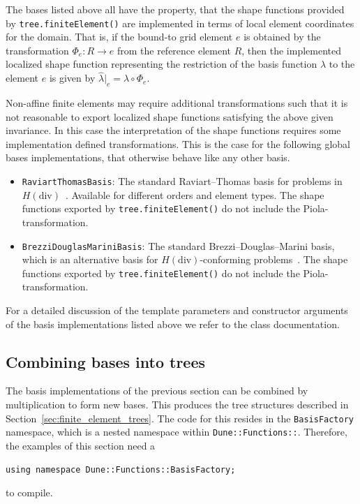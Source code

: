 \documentclass[a4paper,10pt,headings=normal,bibliography=totoc]{scrartcl}
\newcommand{\cpp}[1]{\lstinline[basicstyle=\ttfamily]!#1!}
\newcommand{\todograeser}[1]{\todo[inline,color=lightblue,author=CG]{#1}}
\begin{document}
The bases listed above all have the property, that the shape functions provided by
\cpp{tree.finiteElement()} are implemented in terms of local element coordinates
for the domain. That is, if the bound-to grid element $e$ is obtained by the transformation
$\Phi_e:R \to e$ from the reference element $R$, then the implemented localized shape function
representing the restriction of the basis function $\lambda$ to the
element $e$ is given by $\hat{\lambda}|_e = \lambda\circ\Phi_e$.

Non-affine finite elements may require additional transformations such that it is
not reasonable to export localized shape functions satisfying the above given
invariance. In this case the interpretation of the shape functions requires some
implementation defined transformations. This is the case for the following global
bases implementations, that otherwise behave like any other basis.

\begin{itemize}
 \item \cpp{RaviartThomasBasis}: The standard Raviart--Thomas basis for problems in
  $H(\text{div})$~\cite{boffi_brezzi_fortin:2013}.  Available for different orders and element types.
  The shape functions exported by \cpp{tree.finiteElement()} do not include the Piola-transformation.

 \item \cpp{BrezziDouglasMariniBasis}: The standard Brezzi--Douglas--Marini basis, which is an
  alternative basis for $H(\text{div})$-conforming problems~\cite{boffi_brezzi_fortin:2013}.
  The shape functions exported by \cpp{tree.finiteElement()} do not include the Piola-transformation.
  \todograeser{Is this correct for BDM?}
\end{itemize}

For a detailed discussion of the template parameters and constructor arguments
of the basis implementations listed above we refer to the class documentation.


\subsection{Combining bases into trees}
\label{sec:composed_bases}

The basis implementations of the previous section can be combined by multiplication to form new bases.
This produces the tree structures described in Section~\ref{sec:finite_element_trees}.
The code for this resides in the \cpp{BasisFactory} namespace, which is a nested namespace
within \cpp{Dune::Functions::}. Therefore, the examples of this section need a
\begin{lstlisting}[style=Example]
using namespace Dune::Functions::BasisFactory;
\end{lstlisting}
to compile.
\end{document}
